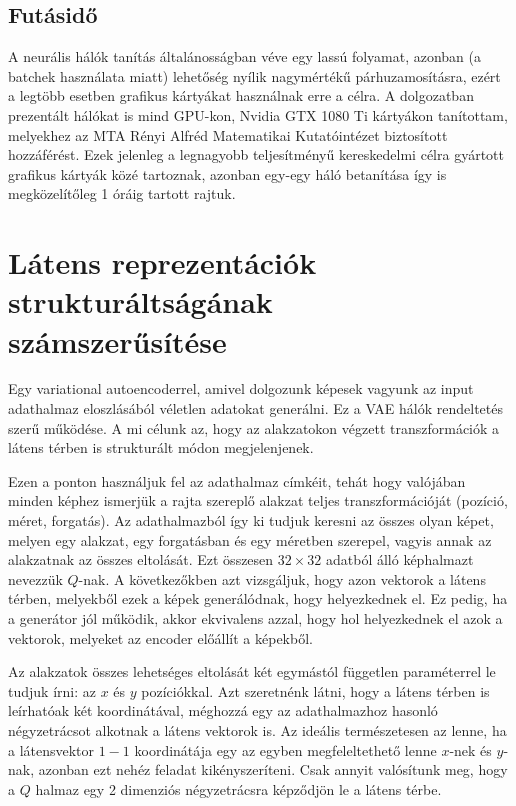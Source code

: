 \subsection{Futásidő}

A neurális hálók tanítás általánosságban véve egy lassú folyamat, azonban (a batchek használata miatt) lehetőség nyílik nagymértékű párhuzamosításra, ezért a legtöbb esetben grafikus kártyákat használnak erre a célra. A dolgozatban prezentált hálókat is mind GPU-kon, Nvidia GTX 1080 Ti kártyákon tanítottam, melyekhez az MTA Rényi Alfréd Matematikai Kutatóintézet biztosított hozzáférést. Ezek jelenleg a legnagyobb teljesítményű kereskedelmi célra gyártott grafikus kártyák közé tartoznak, azonban egy-egy háló betanítása így is megközelítőleg 1 óráig tartott rajtuk.

\section{Látens reprezentációk strukturáltságának\\ számszerűsítése}

Egy variational autoencoderrel, amivel dolgozunk képesek vagyunk az input adathalmaz eloszlásából véletlen adatokat generálni. Ez a VAE hálók rendeltetés szerű működése. A mi célunk az, hogy az alakzatokon végzett transzformációk a látens térben is strukturált módon megjelenjenek.

Ezen a ponton használjuk fel az adathalmaz címkéit, tehát hogy valójában minden képhez ismerjük a rajta szereplő alakzat teljes transzformációját (pozíció, méret, forgatás). Az adathalmazból így ki tudjuk keresni az összes olyan képet, melyen egy alakzat, egy forgatásban és egy méretben szerepel, vagyis annak az alakzatnak az összes eltolását. Ezt összesen $32\times32$ adatból álló képhalmazt nevezzük $Q$-nak. A következőkben azt vizsgáljuk, hogy azon vektorok a látens térben, melyekből ezek a képek generálódnak, hogy helyezkednek el. Ez pedig, ha a generátor jól működik, akkor ekvivalens azzal, hogy hol helyezkednek el azok a vektorok, melyeket az encoder előállít a képekből.

Az alakzatok összes lehetséges eltolását két egymástól független paraméterrel le tudjuk írni: az $x$ és $y$ pozíciókkal. Azt szeretnénk látni, hogy a látens térben is leírhatóak két koordinátával, méghozzá egy az adathalmazhoz hasonló négyzetrácsot alkotnak a látens vektorok is. Az ideális természetesen az lenne, ha a látensvektor $1-1$ koordinátája egy az egyben megfeleltethető lenne $x$-nek és $y$-nak, azonban ezt nehéz feladat kikényszeríteni. Csak annyit valósítunk meg, hogy a $Q$ halmaz egy 2 dimenziós négyzetrácsra képződjön le a látens térbe. 


